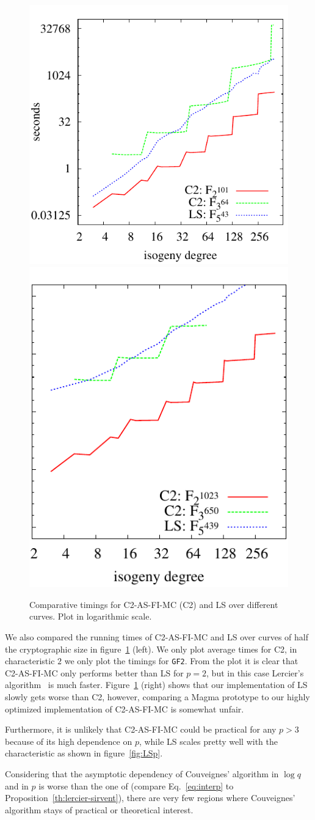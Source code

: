 \begin{figure}
  \centering
  \includegraphics[height=0.45\textwidth]{isogeny/C2-LS}
  \includegraphics[height=0.45\textwidth]{isogeny/C2-LS2}
   \caption{Comparative timings for C2-AS-FI-MC (C2) and LS over
     different curves. Plot in logarithmic scale.}
  \label{fig:comp}
\end{figure}

We also compared the running times of C2-AS-FI-MC and LS over curves
of half the cryptographic size in figure~\ref{fig:comp} (left). We
only plot average times for C2, in characteristic $2$ we only plot the
timings for \texttt{GF2}. From the plot it is clear that C2-AS-FI-MC
only performs better than LS for $p=2$, but in this case Lercier's
algorithm~\cite{lercier96} is much faster.  Figure~\ref{fig:comp}
(right) shows that our implementation of LS slowly gets worse than C2,
however, comparing a Magma prototype to our highly optimized
implementation of C2-AS-FI-MC is somewhat unfair.

Furthermore, it is unlikely that C2-AS-FI-MC could be
practical for any $p>3$ because of its high dependence on $p$, while
LS scales pretty well with the characteristic as shown in
figure~\ref{fig:LSp}.

Considering that the asymptotic dependency of Couveignes' algorithm in
$\log q$ and in $p$ is worse than the one of
\hyperref[alg:le-si]{} (compare
Eq.~\eqref{eq:interp} to Proposition~\ref{th:lercier-sirvent}), there
are very few regions where Couveignes' algorithm stays of practical or
theoretical interest.

